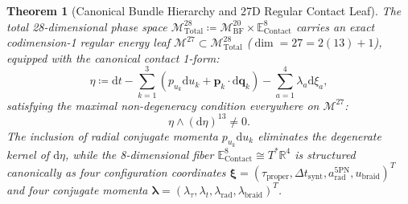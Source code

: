 \documentclass[11pt,a4paper,reqno]{article}
\theoremstyle{plain}
\newtheorem{theorem}{Theorem}[section]
\theoremstyle{definition}
\theoremstyle{remark}
\numberwithin{equation}{section}
\numberwithin{table}{section}
\newcommand{\MbfTwenty}{\mathcal{M}_{\mathrm{BF}}^{20}}
\newcommand{\Econtact}{\mathbb{E}_{\mathrm{Contact}}^8}
\newcommand{\Mtotal}{\mathcal{M}_{\mathrm{Total}}^{28}}
\newcommand{\Mleaf}{\mathcal{M}^{27}}
\providecommand{\diff}{\mathrm{d}}
\begin{document}
\begin{theorem}[Canonical Bundle Hierarchy and 27D Regular Contact Leaf]
\label{thm:bundle_hierarchy_leaf}
The total 28-dimensional phase space $\Mtotal \coloneqq \MbfTwenty \times \Econtact$ carries an exact codimension-1 regular energy leaf $\Mleaf \subset \Mtotal$ ($\dim = 27 = 2(13) + 1$), equipped with the canonical contact 1-form:
\begin{equation}
  \eta \coloneqq \diff t - \sum_{k=1}^3 \left( p_{u_k} \diff u_k + \bm{p}_k \cdot \diff\bm{q}_k \right) - \sum_{a=1}^4 \lambda_a \diff\xi_a,
  \label{eq:canonical_contact_1form}
\end{equation}
satisfying the maximal non-degeneracy condition everywhere on $\Mleaf$:
\begin{equation}
  \eta \wedge (\diff\eta)^{13} \ne 0.
\end{equation}
The inclusion of radial conjugate momenta $p_{u_k} \diff u_k$ eliminates the degenerate kernel of $\diff\eta$, while the 8-dimensional fiber $\Econtact \cong T^*\mathbb{R}^4$ is structured canonically as four configuration coordinates $\bm{\xi} = (\tau_{\mathrm{proper}}, \Delta t_{\mathrm{synt}}, a_{\mathrm{rad}}^{5\mathrm{PN}}, u_{\mathrm{braid}})^T$ and four conjugate momenta $\bm{\lambda} = (\lambda_\tau, \lambda_t, \lambda_{\mathrm{rad}}, \lambda_{\mathrm{braid}})^T$.
\end{theorem}
\end{document}
